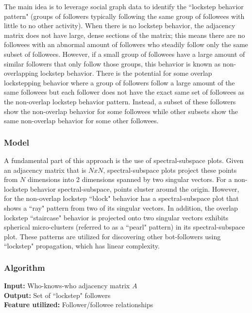 \documentclass[11pt, oneside]{article}   	%
\begin{document}
\quad The main idea \cite{lockstep} is to leverage social graph data to identify the ``lockstep behavior pattern" (groups of followers typically following the same group of followees with little to no other activity).
When there is no lockstep behavior, the adjacency matrix does not have large, dense sections of the matrix; this means there are no followees with an abnormal amount of followers who steadily follow only the same subset of followees.
However, if a small group of followees have a large amount of similar followers that only follow those groups, this behavior is known as non-overlapping lockstep behavior.
There is the potential for some overlap lockstepping behavior where a group of followers follow a large amount of the same followees but each follower does not have the exact same set of followees as the non-overlap lockstep behavior pattern.
Instead, a subset of these followers show the non-overlap behavior for some followees while other subsets show the same non-overlap behavior for some other followees.

\subsubsection*{Model}

\quad A fundamental part of this approach is the use of spectral-subspace plots.
Given an adjacency matrix that is $NxN$, spectral-subspace plots project these points from $N$ dimensions into 2 dimensions spanned by two singular vectors.
For a non-lockstep behavior spectral-subspace, points cluster around the origin.
However, for the non-overlap lockstep ``block" behavior has a spectral-subspace plot that shows a ``ray" pattern from two of its singular vectors.
In addition, the overlap lockstep ``staircase" behavior is projected onto two singular vectors exhibits spherical micro-clusters (referred to as a ``pearl" pattern) in its spectral-subspace plot.
These patterns are utilized for discovering other bot-followers using ``lockstep" propagation, which has linear complexity.

\subsubsection*{Algorithm}

\textbf{Input:} Who-knows-who adjacency matrix $A$\\
\textbf{Output:} Set of ``lockstep" followers\\
\textbf{Feature utilized:} Follower/followee relationships
\end{document}
